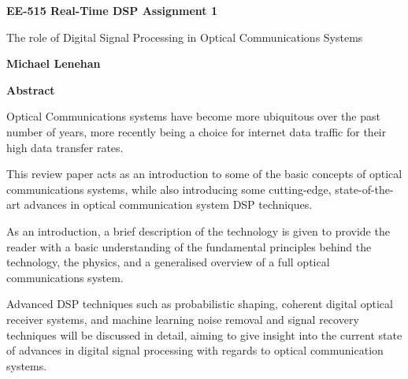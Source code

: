 \thispagestyle{plain}
\begin{center}
    \Large
    \textbf{EE-515 Real-Time DSP Assignment 1}

    \vspace{0.4cm}
    \large
    The role of Digital Signal Processing in Optical Communications Systems

    \vspace{0.4cm}
    \textbf{Michael Lenehan}

    \vspace{0.9cm}
    \textbf{Abstract}

\end{center}

\par Optical Communications systems have become more ubiquitous over the
past number of years, more recently being a choice for internet data traffic for
their high data transfer rates.

\par This review paper acts as an introduction to some of the basic concepts of
optical communications systems, while also introducing some cutting-edge,
state-of-the-art advances in optical communication system DSP techniques.

\par As an introduction, a brief description of the technology is given to
provide the reader with a basic understanding of the fundamental principles behind the
technology, the physics, and a generalised overview of a full optical
communications system.

\par Advanced DSP techniques such as probabilistic shaping, coherent digital
optical receiver systems, and machine learning noise removal and signal recovery
techniques will be discussed in detail, aiming to give insight into the current
state of advances in digital signal processing with regards to optical
communication systems.

\pagebreak
